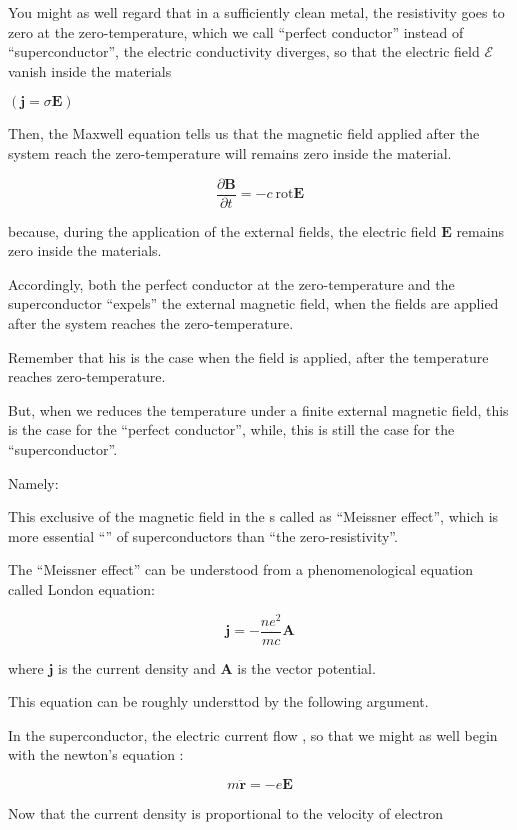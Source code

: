 ﻿\documentclass[twoside]{book}
\numberwithin{equation}{section}
\begin{document}
You might as well regard that in a sufficiently clean metal, the resistivity goes to zero at the zero-temperature, which we call ``perfect conductor'' instead of ``superconductor'', the electric conductivity diverges, so that the electric field $\mathscr{E}$ vanish inside the materials 

\noindent $(\bm{j} = \sigma \bm{E}) $

Then, the Maxwell equation tells us that the magnetic field {} applied after the system reach the zero-temperature will remains zero inside the material. 

\[\frac{\partial \bm{B}}{\partial t} = -c\ \text{rot}\bm{E} \]

because, during the application of the external fields, the electric field $\bm{E}$ remains zero inside the materials. 

Accordingly, both the perfect conductor at the zero-temperature and the superconductor ``expels'' the external magnetic field, when the fields are applied {} after the system reaches the zero-temperature. 

Remember that his is the case when the field is applied, after the temperature reaches zero-temperature. 

But, when we reduces the temperature under a finite external magnetic field, this is {} the case for the ``perfect conductor'', while, this is still the case for the ``superconductor''. 

Namely: 

This exclusive of the magnetic field in the {} s called as ``Meissner effect'', which is more essential ``'' of superconductors than ``the zero-resistivity''. 

The ``Meissner effect'' can be understood from a phenomenological equation called London equation: 

\[\bm{j} = -\frac{ne^2}{mc}\bm{A} \]

where $\bm{j}$ is the current density and $\bm{A}$ is the vector potential. 

This equation can be roughly understtod by the following argument. 

In the superconductor, the electric current flow {}, so that we might as well begin with the newton's equation {}: 

\[m\ddot{\bm{r}} = -e\bm{E} \]

Now that the current density is proportional to the velocity of electron
\end{document}
